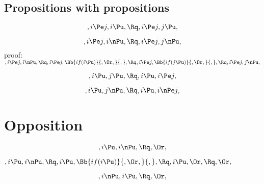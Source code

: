 \bigskip
\bigskip
\bigskip
\bigskip
\subsection{Propositions with propositions}
\[,i \Pe j, i \Pu, \Rq , i \Pe j, j \Pu,\]



\[,i \Pe j, i \nPu, \Rq , i \Pe j, j \nPu,\]
\bigskip
\bigskip
\bigskip
\bigskip
proof:\\
\begin{math} 
,i \Pe j, i \nPu,\\\\\\
\Rq, i \Pe j, \Bb{if(i \Pu)}{, \Or,}{,}, \\\\\\
\Rq, i \Pe j, \Bb{if(j \Pu)}{, \Or,}{,}, \\\\\\
\Rq, i \Pe j, j \nPu,
\end{math}



\[,i \Pu, j \Pu, \Rq , i \Pu, i \Pe j,\]

\[,i \Pu, j \nPu, \Rq , i \Pu, i \nPe j,\]




\bigskip
\bigskip
\bigskip
\bigskip
\section{ Opposition}
\[,i \Pu, i \nPu, \Rq , \Or,\]

\bigskip
\bigskip
\begin{math} 
,i \Pu, i \nPu,\\\\\\
\Rq, i \Pu, \Bb{if( i \Pu)}{, \Or ,}{,}, \\\\\\
\Rq, i \Pu, \Or, \\\\\\
\Rq, \Or, 
\end{math}

\[,i \nPu, i \Pu, \Rq , \Or,\]






\newpage

